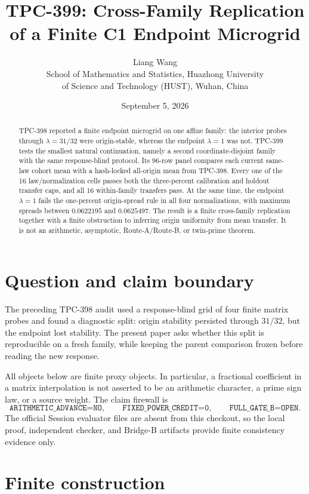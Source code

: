 \documentclass[10pt]{article}
\title{TPC-399: Cross-Family Replication of a Finite C1 Endpoint Microgrid}
\author{Liang Wang\\
School of Mathematics and Statistics, Huazhong University\\
of Science and Technology (HUST), Wuhan, China}
\date{September 5, 2026}
\begin{document}
\maketitle

\begin{abstract}
TPC-398 reported a finite endpoint microgrid on one affine family: the
interior probes through $\lambda=31/32$ were origin-stable, whereas the
endpoint $\lambda=1$ was not.  TPC-399 tests the smallest natural continuation,
namely a second coordinate-disjoint family with the same response-blind
protocol.  Its 96-row panel compares each current same-law cohort mean with a
hash-locked all-origin mean from TPC-398.  Every one of the 16 law/normalization
cells passes both the three-percent calibration and holdout transfer caps, and
all 16 within-family transfers pass.  At the same time, the endpoint $\lambda=1$
fails the one-percent origin-spread rule in all four normalizations, with
maximum spreads between $0.0622195$ and $0.0625497$.  The result is a finite
cross-family replication together with a finite obstruction to inferring origin
uniformity from mean transfer.  It is not an arithmetic, asymptotic,
Route-A/Route-B, or twin-prime theorem.
\end{abstract}

\section{Question and claim boundary}

The preceding TPC-398 audit used a response-blind grid of four finite matrix
probes and found a diagnostic split: origin stability persisted through
$31/32$, but the endpoint lost stability.  The present paper asks whether this
split is reproducible on a fresh family, while keeping the parent comparison
frozen before reading the new response.

All objects below are finite proxy objects.  In particular, a fractional
coefficient in a matrix interpolation is not asserted to be an arithmetic
character, a prime sign law, or a source weight.  The claim firewall is
\[
 \texttt{ARITHMETIC\_ADVANCE=NO},\qquad
 \texttt{FIXED\_POWER\_CREDIT=0},\qquad
 \texttt{FULL\_GATE\_B=OPEN}.
\]
The official Session evaluator files are absent from this checkout, so the
local proof, independent checker, and Bridge-B artifacts provide finite
consistency evidence only.

\section{Finite construction}
\end{document}
